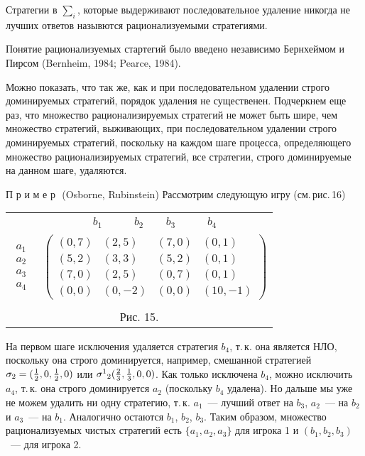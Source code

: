 \documentclass[12pt]{article}
\begin{document}
\begin{definition}
Стратегии в $\sum_i$, которые выдерживают последовательное удаление
никогда не лучших ответов назывются рационализуемыми стратегиями.
\end{definition}

Понятие рационализуемых стартегий было введено независимо Бернхеймом
и Пирсом (Bernheim, 1984; Pearce, 1984).

Можно показать, что так же, как и при последовательном удалении
строго доминируемых стратегий, порядок удаления не существенен.
Подчеркнем еще раз, что множество рационализируемых стратегий не
может быть шире, чем множество стратегий, выживающих, при
последовательном удалении строго доминируемых стратегий, поскольку
на каждом шаге процесса, определяющего множество рационализируемых
стратегий, все стратегии, строго доминируемые на данном шаге,
удаляются.

П р и м е р\,\, (Osborne, Rubinstein) Рассмотрим следующую игру
(см.\,рис.\,16)

\begin{center}
\begin{tabular}{cc}
&$\begin{array}{cccc} b_1\qquad& b_2\quad\,& b_3&\qquad b_4 \end{array}$\\
$\begin{array}{c} a_1\\ a_2\\ a_3\\ a_4 \end{array}$&
$\left(\begin{array}{cccc} (0,7)&(2,5)&(7,0)&(0,1)\\
(5,2)&(3,3)&(5,2)&(0,1)\\
(7,0)&(2,5)&(0,7)&(0,1)\\
(0,0)&(0,-2)&(0,0)&(10,-1)\end{array}\right)$\\
\multicolumn{2}{c}{}\\
\multicolumn{2}{c}{Рис. 15.}\\
\end{tabular}
\end{center}

На первом шаге исключения удаляется стратегия $b_4$, т.\,к. она
является НЛО, поскольку она строго доминируется, например, смешанной
стратегией $\sigma_2=({1\over 2},0,{1\over 2},0)$ или
${\sigma^1}_2({2\over 3},{1\over 3},0,0)$. Как только исключена
$b_4$, можно исключить $a_4$, т.\,к. она строго доминируется $a_2$
(поскольку $b_4$ удалена). Но дальше мы уже не можем удалить ни одну
стратегию, т.\,к. $a_1$~--- лучший ответ на $b_3$, $a_2$~--- на
$b_2$ и $a_3$~--- на  $b_1$. Аналогично остаются $b_1$, $b_2$,
$b_3$. Таким образом, множество рационализуемых чистых стратегий
есть $\{a_1,a_2,a_3\}$ для игрока 1 и $(b_1,b_2,b_3)$~--- для игрока
2.
\end{document}
